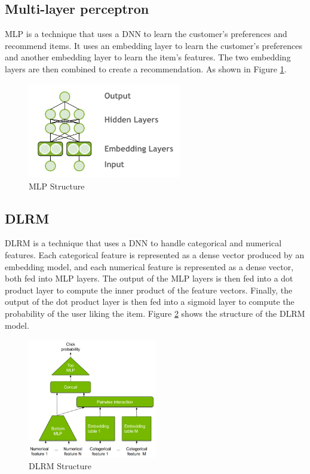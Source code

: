 \subsection{Multi-layer perceptron}
MLP is a technique that uses a DNN to learn the customer's preferences and recommend items. It uses an embedding layer to learn the customer's preferences and another embedding layer to learn the item's features. The two embedding layers are then combined to create a recommendation. As shown in Figure \ref{fig:multi-layer-perceptron}.
\begin{figure}[H]
    \centering
    \includegraphics[width=0.6\textwidth]{assets/mlp.png}
    \caption[MLP Structure]{MLP Structure \cite{ExploringMerlinModels}}
    \label{fig:multi-layer-perceptron}
\end{figure}

\subsection{DLRM}
DLRM is a technique that uses a DNN to handle categorical and numerical features. 
Each categorical feature is represented as a dense vector produced by an embedding model, 
and each numerical feature is represented as a dense vector, both fed into MLP layers. 
The output of the MLP layers is then fed into a dot product layer to compute the inner product of the feature vectors. 
Finally, the output of the dot product layer is then fed into a sigmoid layer to compute the probability of the user liking the item. Figure \ref{fig:dlrm} shows the structure of the DLRM model.

\begin{figure}[H]
    \centering
    \includegraphics[width=0.5\textwidth]{assets/dlrm.png}
    \caption[DLRM Structure]{DLRM Structure \cite{NvidiaRecSys}}
    \label{fig:dlrm}
\end{figure}
